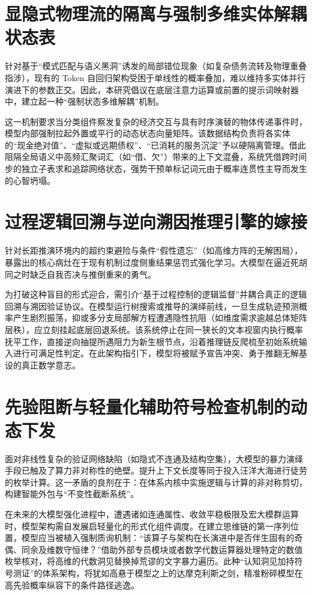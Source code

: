 \documentclass[12pt, a4paper]{report}
\begin{document}
\section{显隐式物理流的隔离与强制多维实体解耦状态表}

针对基于“模式匹配与语义黑洞”诱发的局部错位现象（如复杂债务流转及物理重叠指涉），现有的 Token 自回归架构受困于单线性的概率叠加，难以维持多实体并行演进下的参数正交。因此，本研究倡议在底层注意力运算或前置的提示词映射器中，建立起一种“强制状态多维解耦”机制。

这一机制要求当分类组件察发复杂的经济交互与具有时序演替的物体传递事件时，模型内部强制拉起外置或平行的动态状态向量矩阵。该数据结构负责将各实体的“现金绝对值”、“虚拟或远期债权”、“已消耗的服务沉淀”予以硬隔离管理。借此阻隔全局语义中高频汇聚词汇（如“借、欠”）带来的上下文混叠，系统凭借跨时间步的独立子表求和追踪网络状态，强势干预单标记词元由于概率连贯性主导而发生的心智坍塌。

\section{过程逻辑回溯与逆向溯因推理引擎的嫁接}

针对长距推演环境内的超约束避险与条件“假性遗忘”（如高维方阵的无解困局），暴露出的核心病灶在于现有机制过度侧重结果惩罚式强化学习。大模型在逼近死胡同之时缺乏自我否决与推倒重来的勇气。

为打破这种盲目的形式迎合，需引介“基于过程控制的逻辑监督”并耦合真正的逻辑回溯与溯因验证协议。在模型运行树搜索或推导的演绎前线，一旦生成轨迹预测概率产生剧烈振荡，抑或多分支局部解方程遭遇隐性抗阻（如维度需求逾越总体矩阵层秩），应立刻挂起底层回退系统。该系统停止在同一狭长的文本视窗内执行概率抚平工作，直接逆向抽提所遇阻力为新生根节点，沿着推理链反爬梳至初始系统输入进行可满足性判定。在此架构指引下，模型将被赋予宣告冲突、勇于推翻无解基设的真正数学意志。

\section{先验阻断与轻量化辅助符号检查机制的动态下发}

面对非线性复杂的验证网络缺陷（如隐式不连通及结构空集），大模型的暴力演绎手段已触及了算力非对称性的绝壁。提升上下文长度等同于投入汪洋大海进行徒劳的枚举计算。这一矛盾的良剂在于：在体系内核中实施逻辑与计算的非对称剪切，构建智能外包与“不变性截断系统”。

在未来的大模型强化进程中，遭遇诸如连通属性、收敛平稳极限及宏大模群运算时，模型架构需自发展启轻量化的形式化组件调度。在建立思维链的第一序列位置，模型应当被植入强制质询机制：“该算子与架构在长演进中是否伴生固有的奇偶、同余及维数守恒律？”借助外部专员模块或者数学代数运算器处理特定的数值枚举核对，将高维的代数洞见替换掉荒谬的文字暴力遍历。此种“认知洞见加持符号测证”的体系架构，将犹如高悬于模型之上的达摩克利斯之剑，精准粉碎模型在高先验概率纵容下的条件路径逃逸。
\end{document}
